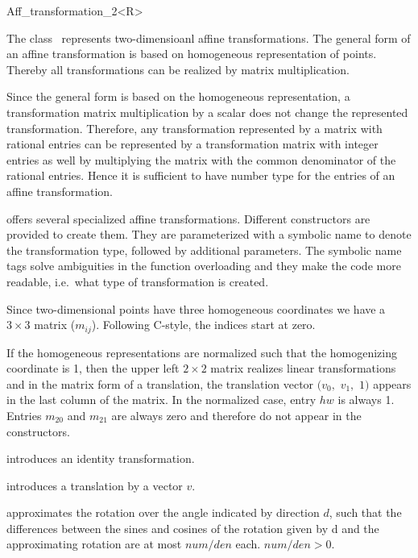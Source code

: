 \begin{ccRefClass}{Aff_transformation_2<R>}

\ccDefinition
The class \ccRefName\ represents two-dimensioanl affine transformations. 
The general form of an affine transformation is based on homogeneous
representation of points. Thereby all transformations can be realized by
matrix multiplication. 

Since the general form is based on the homogeneous representation, a
transformation matrix multiplication by a scalar does not change
the represented transformation. Therefore, any transformation represented
by a matrix with rational entries can be represented by a 
transformation matrix with integer entries as well by multiplying
the matrix with the common denominator of the rational entries. 
Hence it is sufficient to have number type  for the entries 
of an affine transformation.

{\cgal} offers several specialized affine transformations. 
Different constructors are provided to create them. 
They are parameterized with a symbolic name to
denote the transformation type, followed by additional parameters.
The symbolic name tags solve ambiguities in the function
overloading and they make the code more readable, i.e.\ what type
of transformation is created.

Since two-dimensional points have three 
homogeneous coordinates we have a $3\times 3$ matrix ($m_{ij}$).
Following C-style, the indices start at zero.

If the homogeneous representations are normalized such that the 
homogenizing coordinate is 1, then the upper left $2\times 2$ matrix realizes
linear transformations and in the matrix form of a translation,  the
translation vector $(v_0,$ $v_1,$ $1)$ appears in the last column of the 
matrix. In the normalized case, entry $hw$ is always 1.
Entries $m_{20}$ and $m_{21}$ are always zero and therefore do not appear in
the constructors.


\ccCreation
{}

            {introduces an identity transformation.}

            {introduces a translation by a vector $v$.}

            {approximates the rotation over the angle indicated by direction 
             $d$, such that the differences between the sines and cosines
             of the rotation given by d and the approximating rotation
             are at most $num/den$ each.
             \ccPrecond $num/den>0$. }


\end{ccRefClass}
